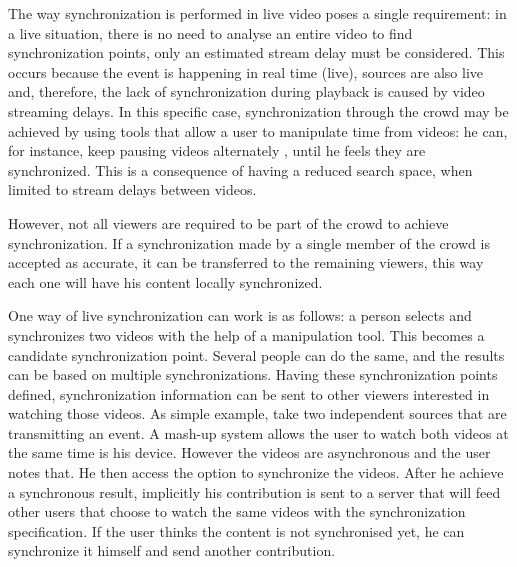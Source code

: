 \documentclass{sig-alternate-05-2015}
\begin{document}
The way synchronization is performed in live video poses a single requirement: in a live situation, there is no need to analyse an entire video to find synchronization points, only an estimated stream delay must be considered. This occurs because the event is happening in real time (live), sources are also live and, therefore, the lack of synchronization during playback is caused by video streaming delays. In this specific case, synchronization through the crowd may be achieved by using tools that allow a user to manipulate time from videos: he can, for instance, keep pausing videos alternately , until he feels they are synchronized. This is a consequence of having a reduced search space, when limited to stream delays between videos.

However, not all viewers are required to be part of the crowd to achieve synchronization. If a synchronization made by a single member of the crowd is accepted as accurate, it can be transferred to the remaining viewers, this way each one will have his content locally synchronized.

One way of live synchronization can work is as follows: a person selects and synchronizes two videos with the help of a manipulation tool. This becomes a candidate synchronization point. Several people can do the same, and the results can be based on multiple synchronizations. Having these synchronization points defined, synchronization information can be sent to other viewers interested in watching those videos. As simple example, take two independent sources that are transmitting an event. A mash-up system allows the user to watch both videos at the same time is his device. However the videos are asynchronous and the user notes that. He then access the option to synchronize the videos. After he achieve a synchronous result, implicitly his contribution is sent to a server that will feed other users that choose to watch the same videos with the synchronization specification. If the user thinks the content is not synchronised yet, he can synchronize it himself and send another contribution.

\end{document}
